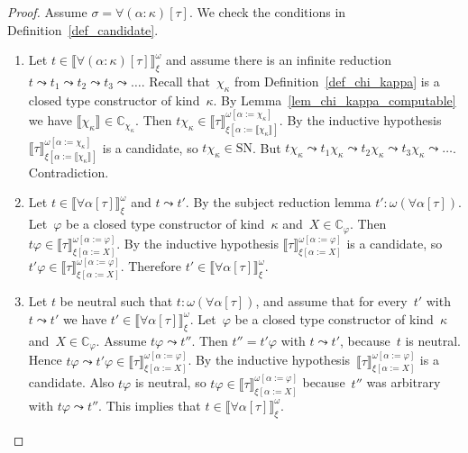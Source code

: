 \documentclass[runningheads,a4paper]{llncs}
\newcommand{\subst}[2]{#1:=#2}
\newcommand{\SN}{\mathrm{SN}}
\newcommand{\Cb}{\mathbb{C}}
\newcommand{\val}[3]{\ensuremath{\llbracket#1\rrbracket_{#2}^{#3}}}
\begin{document}
\begin{proof}
  Assume $\sigma = \forall(\alpha:\kappa)[\tau]$. We check the
  conditions in Definition~\ref{def_candidate}.
  \begin{enumerate}
  \item Let $t \in \val{\forall(\alpha:\kappa)[\tau]}{\xi}{\omega}$
    and assume there is an infinite reduction $t \leadsto t_1 \leadsto
    t_2 \leadsto t_3 \leadsto \ldots$. Recall that~$\chi_\kappa$ from
    Definition~\ref{def_chi_kappa} is a closed type constructor of
    kind~$\kappa$. By Lemma~\ref{lem_chi_kappa_computable} we have
    $\val{\chi_{\kappa}}{}{} \in \Cb_{\chi_\kappa}$. Then $t
    \chi_\kappa \in
    \val{\tau}{\xi[\subst{\alpha}{\val{\chi_\kappa}{}{}}]}{\omega[\subst{\alpha}{\chi_\kappa}]}$. By
    the inductive hypothesis
    $\val{\tau}{\xi[\subst{\alpha}{\val{\chi_\kappa}{}{}}]}{\omega[\subst{\alpha}{\chi_\kappa}]}$
    is a candidate, so $t \chi_\kappa \in \SN$. But $t \chi_\kappa
    \leadsto t_1 \chi_\kappa \leadsto t_2 \chi_\kappa \leadsto t_3
    \chi_\kappa \leadsto \ldots$. Contradiction.
  \item Let $t \in \val{\forall\alpha[\tau]}{\xi}{\omega}$ and $t
    \leadsto t'$. By the subject reduction lemma $t' :
    \omega(\forall\alpha[\tau])$. Let~$\varphi$ be a closed type
    constructor of kind~$\kappa$ and~$X \in \Cb_{\varphi}$. Then $t
    \varphi \in
    \val{\tau}{\xi[\subst{\alpha}{X}]}{\omega[\subst{\alpha}{\varphi}]}$. By
    the inductive hypothesis
    $\val{\tau}{\xi[\subst{\alpha}{X}]}{\omega[\subst{\alpha}{\varphi}]}$
    is a candidate, so $t' \varphi \in
    \val{\tau}{\xi[\subst{\alpha}{X}]}{\omega[\subst{\alpha}{\varphi}]}$. Therefore
    $t' \in \val{\forall\alpha[\tau]}{\xi}{\omega}$.
  \item Let $t$ be neutral such that $t :
    \omega(\forall\alpha[\tau])$, and assume that for every~$t'$ with
    $t \leadsto t'$ we have $t' \in
    \val{\forall\alpha[\tau]}{\xi}{\omega}$. Let~$\varphi$ be a closed
    type constructor of kind~$\kappa$ and~$X \in
    \Cb_{\varphi}$. Assume $t \varphi \leadsto t''$. Then $t'' = t'
    \varphi$ with $t \leadsto t'$, because~$t$ is neutral. Hence $t
    \varphi \leadsto t' \varphi \in
    \val{\tau}{\xi[\subst{\alpha}{X}]}{\omega[\subst{\alpha}{\varphi}]}$. By
    the inductive
    hypothesis~$\val{\tau}{\xi[\subst{\alpha}{X}]}{\omega[\subst{\alpha}{\varphi}]}$
    is a candidate. Also $t \varphi$ is neutral, so $t \varphi \in
    \val{\tau}{\xi[\subst{\alpha}{X}]}{\omega[\subst{\alpha}{\varphi}]}$
    because~$t''$ was arbitrary with $t \varphi \leadsto t''$. This
    implies that $t \in \val{\forall\alpha[\tau]}{\xi}{\omega}$.

\end{enumerate}
\end{proof}
\end{document}
